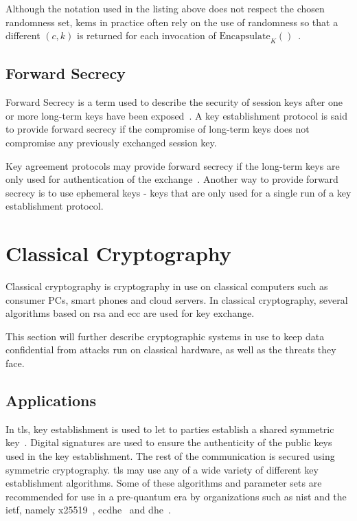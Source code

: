 Although the notation used in the listing above does not respect the chosen randomness set, \glspl{kem} in practice often rely on the use of randomness so that a different $(c,k)$ is returned for each invocation of $\text{Encapsulate}_K()$~\cite{boyd2020}. 

\subsection{Forward Secrecy}

Forward Secrecy is a term used to describe the security of session keys after one or more long-term keys have been exposed~\cite{boyd2020}. A key establishment protocol is said to provide forward secrecy if the compromise of long-term keys does not compromise any previously exchanged session key.

Key agreement protocols may provide forward secrecy if the long-term keys are only used for authentication of the exchange~\cite{boyd2020}. Another way to provide forward secrecy is to use ephemeral keys - keys that are only used for a single run of a key establishment protocol.

\section{Classical Cryptography}
\label{section:background:classical-cryptography}

Classical cryptography is cryptography in use on classical computers such as consumer PCs, smart phones and cloud servers. In classical cryptography, several algorithms based on \gls{rsa} and \gls{ecc} are used for key exchange.

This section will further describe cryptographic systems in use to keep data confidential from attacks run on classical hardware, as well as the threats they face.

\subsection{Applications}
\label{section:background:classical-cryptography:applications}

In \acrfull{tls}, key establishment is used to let to parties establish a shared symmetric key~\cite{bernstein2017}. Digital signatures are used to ensure the authenticity of the public keys used in the key establishment. The rest of the communication is secured using symmetric cryptography. \gls{tls} may use any of a wide variety of different key establishment algorithms. Some of these algorithms and parameter sets are recommended for use in a pre-quantum era by organizations such as \gls{nist} and the \gls{ietf}, namely \gls{x25519}~\cite{rfc7748}, \gls{ecdhe}~\cite{nist2019} and \gls{dhe}~\cite{nist2019}.

